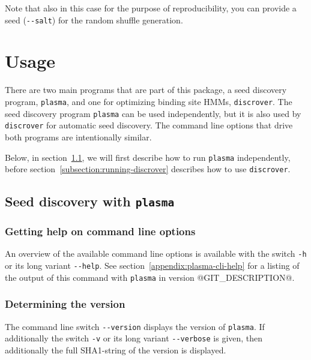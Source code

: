 \documentclass[a4paper]{article}
\makeatletter
\newcommand{\plasma}[0]{\texttt{plasma}}
\newcommand{\discrover}[0]{\texttt{discrover}}
\newcommand{\version}[0]{@GIT_DESCRIPTION@}
\makeatother
\begin{document}
Note that also in this case for the purpose of reproducibility, you can provide a seed (\verb|--salt|) for the random shuffle generation.



\section{Usage}
There are two main programs that are part of this package, a seed discovery program, \plasma{}, and one for optimizing binding site HMMs, \discrover{}.
The seed discovery program \plasma{} can be used independently, but it is also used by \discrover{} for automatic seed discovery.
The command line options that drive both programs are intentionally similar.

Below, in section~\ref{subsection:running-plasma}, we will first describe how to run \plasma{} independently, before section~\ref{subsection:running-discrover} describes how to use \discrover{}.

\subsection{Seed discovery with \plasma{}}
\label{subsection:running-plasma}
\subsubsection{Getting help on command line options}
An overview of the available command line options is available with the switch \verb|-h| or its long variant \verb|--help|.
See section~\ref{appendix:plasma-cli-help} for a listing of the output of this command with \plasma{} in version \version{}.
\subsubsection{Determining the version}
The command line switch \verb|--version| displays the version of \plasma{}.
If additionally the switch \verb|-v| or its long variant \verb|--verbose| is given, then additionally the full SHA1-string of the version is displayed.
\end{document}
